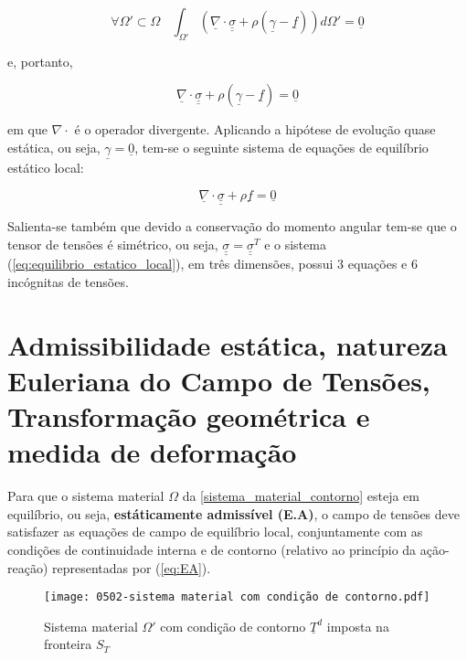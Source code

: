 \begin{equation}
	\label{teorema_divergencia}
	\forall \Omega' \subset \Omega ~~~~ \int_{\Omega'}\left( \underline \nabla \cdot \underline{\underline\sigma}+ \rho(\underline\gamma-\underline f) \right)d\Omega' = \underline 0
\end{equation}

e, portanto,

\begin{equation}
	\label{eq:resultado_teorema_divergencia}
	 \underline \nabla \cdot \underline{\underline\sigma}+ \rho(\underline\gamma-\underline f) = \underline 0
\end{equation}

em que $\nabla \cdot$ é o operador divergente. Aplicando a hipótese de evolução quase estática, ou seja, $\underline\gamma = \underline 0$, tem-se o seguinte sistema de equações de equilíbrio estático local:

\begin{equation}
	\label{eq:equilibrio_estatico_local}
	\underline \nabla \cdot \underline{\underline\sigma}+ \rho \underline f = \underline 0
\end{equation}

Salienta-se também que devido a conservação do momento angular tem-se que o tensor de tensões é simétrico, ou seja, $\underline{\underline\sigma} = \underline{\underline\sigma}^T$ e o sistema (\ref{eq:equilibrio_estatico_local}), em três dimensões, possui 3 equações e 6 incógnitas de tensões.

\section{Admissibilidade estática, natureza Euleriana do Campo de Tensões, Transformação geométrica e medida de deformação}

Para que o sistema material $\Omega$ da \autoref{sistema_material_contorno} esteja em equilíbrio, ou seja, \textbf{estáticamente admissível (E.A)}, o campo de tensões deve satisfazer as equações de campo de equilíbrio local, conjuntamente com as condições de continuidade interna e de contorno (relativo ao princípio da ação-reação) representadas por (\ref{eq:EA}).

\begin{figure}[H]
	\begin{center}
		\texttt{[image: 0502-sistema material com condição de contorno.pdf]}
	\end{center}
	\caption{\label{sistema_material_contorno}Sistema material $\Omega'$ com condição de contorno $\underline T^d$ imposta na fronteira $S_T$}
\end{figure}

